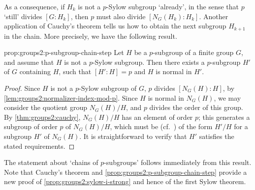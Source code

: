 As a consequence, if $H_k$ is not a $p$-Sylow subgroup `already', in
the sense that $p$ `still' divides $[G : H_k]$, then $p$ must also
divide $[N_G(H_k) : H_k]$. Another application of Cauchy's theorem
tells us how to obtain the next subgroup $H_{k+1}$ in the chain. More
precisely, we have the following result.
\begin{prop}{}{prop:groups2:p-subgroup-chain-step}
  Let $H$ be a $p$-subgroup of a finite group $G$, and assume that $H$
  is not a $p$-Sylow subgroup. Then there exists a $p$-subgroup $H'$
  of $G$ containing $H$, such that $[H' : H] = p$ and $H$ is normal in
  $H'$.
\end{prop}
\begin{proof}
  Since $H$ is not a $p$-Sylow subgroup of $G$, $p$ divides
  $[N_G(H) : H]$, by \cref{lem:groups2:normalizer-index-mod-p}. Since
  $H$ is normal in $N_G(H)$, we may consider the quotient group
  $N_G(H)/H$, and $p$ divides the order of this group. By
  \cref{thm:groups2:cauchy}, $N_G(H)/H$ has an element of order $p$;
  this generates a subgroup of order $p$ of $N_G(H)/H$, which must be
  (cf.\ ) of the form
  $H'/H$ for a subgroup $H'$ of $N_G(H)$. It is straightforward to
  verify that $H'$ satisfies the stated requirements.
\end{proof}
The statement about `chains of $p$-subgroups' follows immediately from
this result. Note that Cauchy's theorem and
\cref{prop:groups2:p-subgroup-chain-step} provide a new proof of
\cref{prop:groups2:sylow-i-strong} and hence of the first Sylow
theorem.

